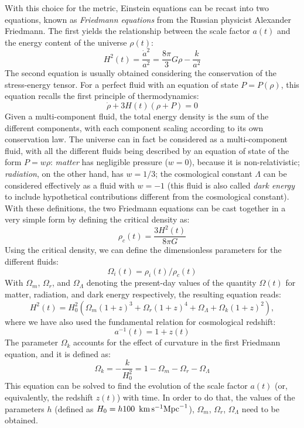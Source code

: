  With this choice for the metric, Einstein equations can be recast into two equations, known as \textit{Friedmann equations} from the Russian physicist Alexander Friedmann. The first yields the relationship between the scale factor $a(t)$ and the energy content of the universe $\rho(t)$:
 \begin{equation}
     H^2(t) = \frac{\Dot{a}^2}{a^2} = \frac{8\pi}{3}G\rho - \frac{k}{a^2}
 \end{equation}
 The second equation is usually obtained considering the conservation of the stress-energy tensor. For a perfect fluid with
 an equation of state $P=P(\rho)$, this equation recalls the first principle of thermodynamics:
 \begin{equation}
     \Dot{\rho} + 3H(t)(\rho+P)=0
 \end{equation}
 Given a multi-component fluid, the total energy density is the sum of the different components, with each component scaling according to its own conservation law. The universe can in fact be considered as a multi-component fluid, with all the different fluids being described by an equation of state of the form $P=w\rho$: \textit{matter} has negligible pressure ($w=0$), because it is non-relativistic; \textit{radiation}, on the other hand, has $w=1/3$; the cosmological constant $\Lambda$ can be considered effectively as a fluid with $w=-1$ (this fluid is also called \textit{dark energy} to include hypothetical contributions different from the cosmological constant). With these definitions, the two Friedmann equations can be cast together in a very simple form by defining the critical density as:
 \begin{equation}
     \rho_c(t) = \frac{3H^2(t)}{8\pi G} \label{eq:friedmann_1}
 \end{equation}
 Using the critical density, we can define the dimensionless parameters for the different fluids:
 \begin{equation}
     \Omega_i (t)= \rho_i(t)/\rho_c(t)
 \end{equation}
 With $\Omega_m$, $\Omega_r$, and $\Omega_\Lambda$ denoting the present-day values of the quantity $\Omega(t)$ for matter, radiation, and dark energy respectively, the resulting equation reads:
 \begin{equation}
     H^2(t)= H_0^2\left(\Omega_m (1+z)^{3} + \Omega_r (1+z)^{4} + \Omega_\Lambda + \Omega_k (1+z)^2\right), \label{eq:friedmann_3}
 \end{equation}
 where we have also used the fundamental relation for cosmological redshift:
 \begin{equation}
     a^{-1}(t)=1+z(t)
 \end{equation}
 The parameter $\Omega_k$ accounts for the effect of curvature in the first Friedmann equation, and it is defined as:
 \begin{equation}
     \Omega_k = -\frac{k}{H_0^2} = 1-\Omega_m-\Omega_r-\Omega_\Lambda
 \end{equation}
 This equation can be solved to find the evolution of the scale factor $a(t)$ (or, equivalently, the redshift $z(t)$) with time. In order to do that, the values of the parameters $h$ (defined as $H_0=h100\, \,\,\rm km\,s^{-1}\mathrm{Mpc}^{-1}$), $\Omega_m$, $\Omega_r$, $\Omega_\Lambda$ need to be obtained. 
 
